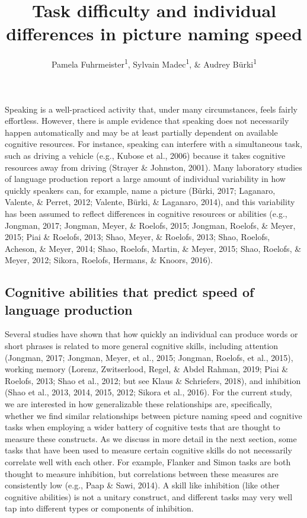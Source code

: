 \documentclass[
  man,floatsintext]{apa6}
\title{Task difficulty and individual differences in picture naming speed}
\author{Pamela Fuhrmeister\textsuperscript{1}, Sylvain Madec\textsuperscript{1}, \& Audrey Bürki\textsuperscript{1}}
\date{}
\affiliation{\vspace{0.5cm}\textsuperscript{1} University of Potsdam, Department of Linguistics}
\begin{document}
\maketitle

Speaking is a well-practiced activity that, under many circumstances, feels fairly effortless. However, there is ample evidence that speaking does not necessarily happen automatically and may be at least partially dependent on available cognitive resources. For instance, speaking can interfere with a simultaneous task, such as driving a vehicle (e.g., Kubose et al., 2006) because it takes cognitive resources away from driving (Strayer \& Johnston, 2001). Many laboratory studies of language production report a large amount of individual variability in how quickly speakers can, for example, name a picture (Bürki, 2017; Laganaro, Valente, \& Perret, 2012; Valente, Bürki, \& Laganaro, 2014), and this variability has been assumed to reflect differences in cognitive resources or abilities (e.g., Jongman, 2017; Jongman, Meyer, \& Roelofs, 2015; Jongman, Roelofs, \& Meyer, 2015; Piai \& Roelofs, 2013; Shao, Meyer, \& Roelofs, 2013; Shao, Roelofs, Acheson, \& Meyer, 2014; Shao, Roelofs, Martin, \& Meyer, 2015; Shao, Roelofs, \& Meyer, 2012; Sikora, Roelofs, Hermans, \& Knoors, 2016).

\hypertarget{cognitive-abilities-that-predict-speed-of-language-production}{%
\subsection{Cognitive abilities that predict speed of language production}\label{cognitive-abilities-that-predict-speed-of-language-production}}

Several studies have shown that how quickly an individual can produce words or short phrases is related to more general cognitive skills, including attention (Jongman, 2017; Jongman, Meyer, et al., 2015; Jongman, Roelofs, et al., 2015), working memory (Lorenz, Zwitserlood, Regel, \& Abdel Rahman, 2019; Piai \& Roelofs, 2013; Shao et al., 2012; but see Klaus \& Schriefers, 2018), and inhibition (Shao et al., 2013, 2014, 2015, 2012; Sikora et al., 2016). For the current study, we are interested in how generalizable these relationships are, specifically, whether we find similar relationships between picture naming speed and cognitive tasks when employing a wider battery of cognitive tests that are thought to measure these constructs. As we discuss in more detail in the next section, some tasks that have been used to measure certain cognitive skills do not necessarily correlate well with each other. For example, Flanker and Simon tasks are both thought to measure inhibition, but correlations between these measures are consistently low (e.g., Paap \& Sawi, 2014). A skill like inhibition (like other cognitive abilities) is not a unitary construct, and different tasks may very well tap into different types or components of inhibition.
\end{document}
